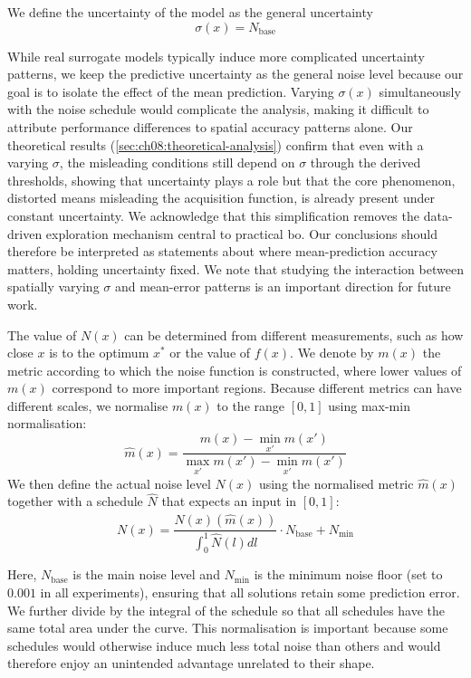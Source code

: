 We define the uncertainty of the model as the general uncertainty
\begin{equation}
    \sigma(x)=N_{\text{base}}
\end{equation}

While real surrogate models typically induce more complicated uncertainty patterns, we keep the predictive uncertainty as the general noise level because our goal is to isolate the effect of the mean prediction. Varying $\sigma(x)$ simultaneously with the noise schedule would complicate the analysis, making it difficult to attribute performance differences to spatial accuracy patterns alone. Our theoretical results (\cref{sec:ch08:theoretical-analysis}) confirm that even with a varying $\sigma$, the misleading conditions still depend on $\sigma$ through the derived thresholds, showing that uncertainty plays a role but that the core phenomenon, distorted means misleading the acquisition function, is already present under constant uncertainty. We acknowledge that this simplification removes the data-driven exploration mechanism central to practical \gls{bo}. Our conclusions should therefore be interpreted as statements about where mean-prediction accuracy matters, holding uncertainty fixed. We note that studying the interaction between spatially varying $\sigma$ and mean-error patterns is an important direction for future work.

The value of $N(x)$ can be determined from different measurements, such as how close $x$ is to the optimum $x^*$ or the value of $f(x)$. We denote by $m(x)$ the metric according to which the noise function is constructed, where lower values of $m(x)$ correspond to more important regions. Because different metrics can have different scales, we normalise $m(x)$ to the range $[0,1]$ using max-min normalisation:
\begin{equation*}
    \hat{m}(x)=\frac{m(x)-\min_{x'}{m(x')}}{\max_{x'}{m(x')}-\min_{x'}{m(x')}}
\end{equation*}
We then define the actual noise level $N(x)$ using the normalised metric $\hat{m}(x)$ together with a schedule $\hat{N}$ that expects an input in $[0,1]$:
\begin{equation*}
    N(x)=\frac{\hat{N}(x)(\hat{m}(x))}{\int_0^1\hat{N}(l)dl} \cdot N_\text{base} + N_\text{min}
\end{equation*}

Here, $N_\text{base}$ is the main noise level and $N_\text{min}$ is the minimum noise floor (set to $0.001$ in all experiments), ensuring that all solutions retain some prediction error. We further divide by the integral of the schedule so that all schedules have the same total area under the curve. This normalisation is important because some schedules would otherwise induce much less total noise than others and would therefore enjoy an unintended advantage unrelated to their shape.

